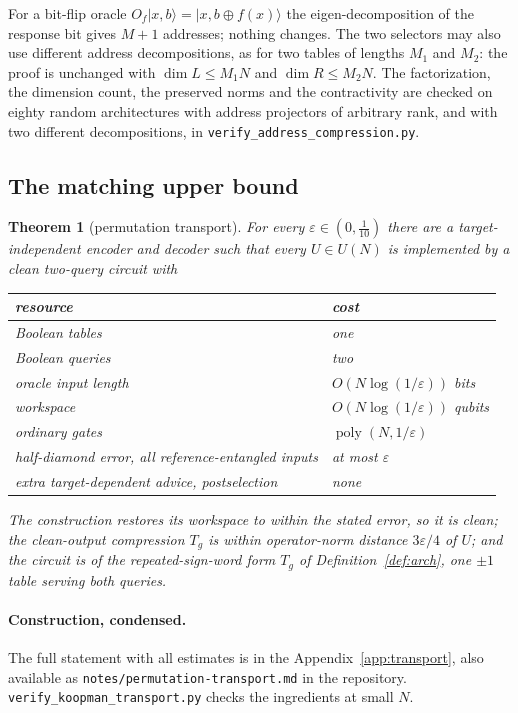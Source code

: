 \documentclass[11pt,a4paper]{article}
\theoremstyle{plain}
\newtheorem{theorem}{Theorem}[section]
\theoremstyle{definition}
\theoremstyle{remark}
\DeclareMathOperator{\poly}{poly}
\begin{document}
For a bit-flip oracle $O_f|x,b\rangle=|x,b\oplus f(x)\rangle$ the eigen-decomposition of the
response bit gives $M+1$ addresses; nothing changes. The two selectors may also use
different address decompositions, as for two tables of lengths $M_1$ and $M_2$: the proof is
unchanged with $\dim L\le M_1N$ and $\dim R\le M_2N$. The factorization, the dimension count,
the preserved norms and the contractivity are checked on eighty random architectures with
address projectors of arbitrary rank, and with two different decompositions, in
\texttt{verify\_address\_compression.py}.

\subsection{The matching upper bound}\label{sec:upper}

\begin{theorem}[permutation transport]\label{thm:transport}
For every $\varepsilon\in(0,\tfrac1{10})$ there are a target-independent encoder and decoder
such that every $U\in U(N)$ is implemented by a clean two-query circuit with
\begin{center}
\begin{tabular}{ll}
\toprule
resource & cost\\
\midrule
Boolean tables & one\\
Boolean queries & two\\
oracle input length & $O(N\log(1/\varepsilon))$ bits\\
workspace & $O(N\log(1/\varepsilon))$ qubits\\
ordinary gates & $\poly(N,1/\varepsilon)$\\
half-diamond error, all reference-entangled inputs & at most $\varepsilon$\\
extra target-dependent advice, postselection & none\\
\bottomrule
\end{tabular}
\end{center}
The construction restores its workspace to within the stated error, so it is clean; the
clean-output compression $T_g$ is within operator-norm distance $3\varepsilon/4$ of
$U$; and the circuit is of the repeated-sign-word form $T_g$ of Definition~\ref{def:arch},
one $\pm1$ table serving both queries.
\end{theorem}

\paragraph{Construction, condensed.} The full statement with all estimates is in the
Appendix~\ref{app:transport}, also available as
\nolinkurl{notes/permutation-transport.md} in the repository.
\nolinkurl{verify_koopman_transport.py} checks the ingredients at small $N$.
\end{document}
